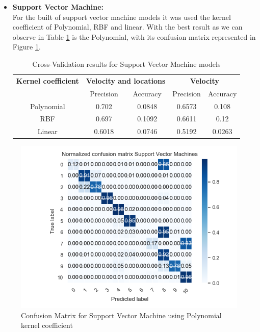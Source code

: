 \begin{itemize}
\newpage
\item \textbf{Support Vector Machine: }\\
For the built of support vector machine models it was used the kernel coefficient of Polynomial, RBF and linear. With the best result as we can observe in Table \ref{table:cross_val_svm} is the Polynomial, with its confusion matrix represented in Figure \ref{fig:cm_cvm}.  



\begin {table}[H]
\begin{center}
\begin{tabular}{c|c|c|c|c}
\multicolumn{1}{c|}{\textbf{Kernel coefficient } }   &\multicolumn{2}{c|}{\textbf{ Velocity and locations}}& \multicolumn{2}{c}{\textbf{ Velocity}}\\
&Precision & Accuracy & Precision & Accuracy \\
\hline
Polynomial    &0.702 &0.0848    & 0.6573&0.108\\
RBF     &0.697&0.1092  & 0.6611&0.12\\
Linear  &0.6018&0.0746  & 0.5192&0.0263
\label{table:cross_val_svm}
\end{tabular}
\caption {Cross-Validation results for Support Vector Machine models}
\end{center}
\end {table}

\end{itemize}

\begin{figure}[h]
    \centering
    \includegraphics[width=0.8\linewidth]{Chapters/img/CM_SVM.png}
    \caption{Confusion Matrix for Support Vector Machine using Polynomial kernel coefficient}
    \label{fig:cm_cvm}
\end{figure}



